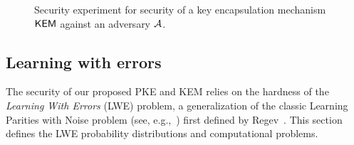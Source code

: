 \begin{figure}[h]
  \centering
  \caption{Security experiment for \MINDCCA security of a key encapsulation mechanism $\textsf{\upshape\mdseries KEM}$ against an adversary $\mathcal{A}$.}%
  \label{fig:kem-mindcca}
\end{figure}


\subsection{Learning with errors}%
\label{sec:lwe}

The security of our proposed PKE and KEM relies on the hardness of the
\emph{Learning With Errors} (LWE) problem, a generalization of the
classic Learning Parities with Noise problem (see,
e.g.,~\cite{C:BFKL93}) first defined by Regev~\cite{Reg09}. This
section defines the LWE probability distributions and computational
problems.

